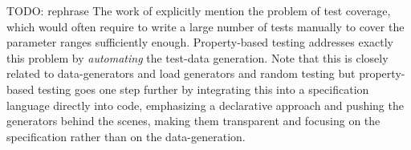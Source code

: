 TODO: rephrase
The work of \cite{onggo_test-driven_2016} explicitly mention the problem of test coverage, which would often require to write a large number of tests manually to cover the parameter ranges sufficiently enough. Property-based testing addresses exactly this problem by \textit{automating} the test-data generation. Note that this is closely related to data-generators \cite{gurcan_generic_2013} and load generators and random testing \cite{burnstein_practical_2010} but property-based testing goes one step further by integrating this into a specification language directly into code, emphasizing a declarative approach and pushing the generators behind the scenes, making them transparent and focusing on the specification rather than on the data-generation. 